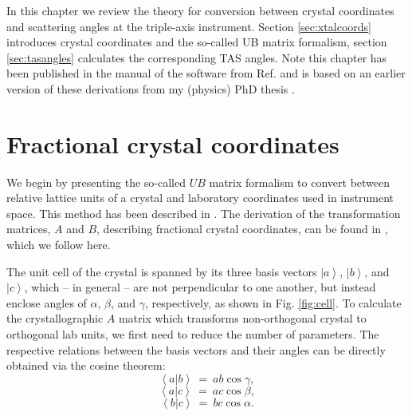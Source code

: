 %
%

In this chapter we review the theory for conversion between crystal coordinates and scattering angles at the triple-axis instrument. Section \ref{sec:xtalcoords} introduces crystal coordinates and the so-called UB matrix formalism, section \ref{sec:tasangles} calculates the corresponding TAS angles. Note this chapter has been published in the manual of the software from Ref. \cite{Takin2021} and is based on an earlier version of these derivations from my (physics) PhD thesis \cite{PhDWeber}.


\section{Fractional crystal coordinates \label{sec:xtalcoords}}

We begin by presenting the so-called $UB$ matrix formalism to convert between relative lattice units of a crystal and laboratory coordinates used in instrument space. This method has been described in \cite{Lumsden2005}. The derivation of the transformation matrices, $A$ and $B$, describing fractional crystal coordinates, can be found in \cite{wiki_fractional}, which we follow here.

The unit cell of the crystal is spanned by its three basis vectors $\left| a \right>$, $\left| b \right>$, and $\left| c \right>$, which -- in general -- are not perpendicular to one another, but instead enclose angles of $\alpha$, $\beta$, and $\gamma$, respectively, as shown in Fig. \ref{fig:cell}. 
To calculate the crystallographic $A$ matrix which transforms non-orthogonal crystal to orthogonal lab units, we first need to reduce the number of parameters.
The respective relations between the basis vectors and their angles can be directly obtained via the cosine theorem:
\begin{equation} \left< a | b \right > \ =\  ab \cos \gamma, \label{ab} \end{equation}
\begin{equation} \left< a | c \right > \ =\  ac \cos \beta, \label{ac} \end{equation}
\begin{equation} \left< b | c \right > \ =\  bc \cos \alpha. \label{bc} \end{equation}

